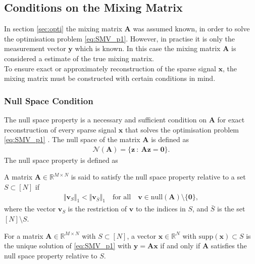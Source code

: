 \subsection{Conditions on the Mixing Matrix}\label{sec:dic_conditions}
In section \ref{sec:opti} the mixing matrix $\mathbf{A}$ was assumed known, in order to solve the optimisation problem \eqref{eq:SMV_p1}. 
However, in practise it is only the measurement vector $\mathbf{y}$ which is known. 
In this case the mixing matrix $\mathbf{A}$ is considered a estimate of the true mixing matrix. 
\\
To ensure exact or approximately reconstruction of the sparse signal $\mathbf{x}$, the mixing matrix must be constructed with certain conditions in mind. 

\subsubsection{Null Space Condition}
The null space property is a necessary and sufficient condition on $\mathbf{A}$ for exact reconstruction of every sparse signal $\mathbf{x}$ that solves the optimisation problem \eqref{eq:SMV_p1} \cite[p. 77]{FR}. 
The null space of the matrix $\mathbf{A}$ is defined as
\begin{align*}
\mathcal{N}(\mathbf{A}) = \{ \mathbf{z} \ : \ \mathbf{Az} = \textbf{0} \}.
\end{align*} 
The null space property is defined as
\begin{definition}
A matrix $\mathbf{A} \in \mathbb{R}^{M \times N}$ is said to satisfy the null space property relative to a set $S \subset [N]$ if
\begin{align}
\Vert \mathbf{v}_S \Vert_1 < \Vert \mathbf{v}_{\overline{S}} \Vert_1 \quad \text{for all} \quad \mathbf{v} \in \text{null}(\mathbf{A}) \setminus \lbrace \mathbf{0} \rbrace,
\end{align}
where the vector $\mathbf{v}_S$ is the restriction of $\mathbf{v}$ to the indices in $S$, and $\bar{S}$ is the set $[N] \setminus S$. 
\end{definition}
\begin{theorem}
For a matrix $\mathbf{A} \in \mathbb{R}^{M \times N}$ with $S \subset [N]$, a vector $\mathbf{x} \in \mathbb{R}^N$ with $\text{supp}(\mathbf{x}) \subset S$ is the unique solution of \eqref{eq:SMV_p1} with $\mathbf{y} = \mathbf{Ax}$ if and only if $\mathbf{A}$ satisfies the null space property relative to $S$.
\end{theorem}
